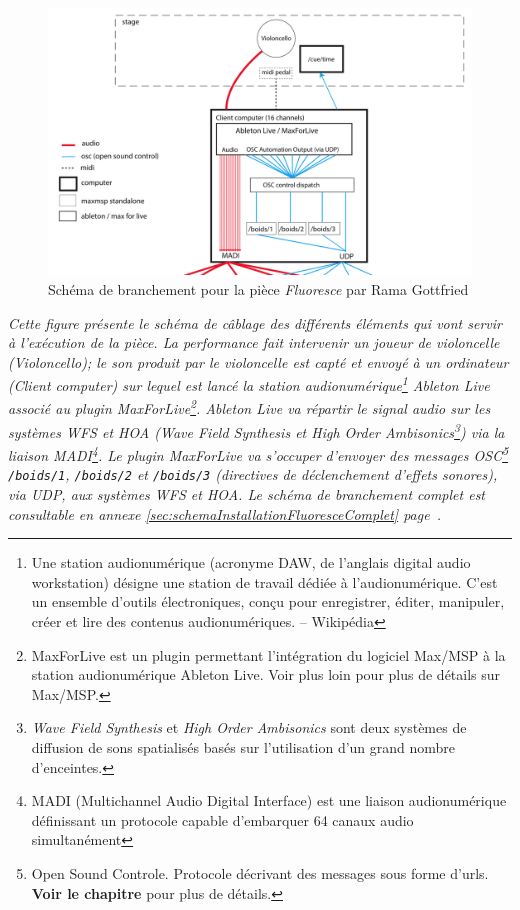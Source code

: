 \begin{figure}[H]
	\centering
	\includegraphics[keepaspectratio=true, width=\textwidth]{Notation/i/schemaInstallationFluoresce.png}
	\caption[Schéma de branchement pour la pièce \textit{Fluoresce} par Rama Gottfried]{Schéma de branchement pour la pièce \textit{Fluoresce} par Rama Gottfried}
	\label{fig:schemaInstallationFluoresce}			
\end{figure}
\begin{center}
\small \it Cette figure présente le schéma de câblage des différents éléments qui vont servir à l'exécution de la pièce. La performance fait intervenir un joueur de violoncelle (\textit{Violoncello}); le son produit par le violoncelle est capté et envoyé à un ordinateur (\textit{Client computer}) sur lequel est lancé la station audionumérique\footnote{Une station audionumérique (acronyme DAW, de l'anglais digital audio workstation) désigne une station de travail dédiée à l'audionumérique. C'est un ensemble d'outils électroniques, conçu pour enregistrer, éditer, manipuler, créer et lire des contenus audionumériques. -- Wikipédia} \textit{Ableton Live} associé au plugin \textit{MaxForLive}\footnote{MaxForLive est un plugin permettant l'intégration du logiciel Max/MSP à la station audionumérique Ableton Live. Voir plus loin pour plus de détails sur Max/MSP.}. Ableton Live va répartir le signal audio sur les systèmes WFS et HOA (\textit{Wave Field Synthesis} et \textit{High Order Ambisonics}\footnote{\textit{Wave Field Synthesis} et \textit{High Order Ambisonics} sont deux systèmes de diffusion de sons spatialisés basés sur l'utilisation d'un grand nombre d'enceintes.}) via la liaison MADI\footnote{MADI (Multichannel Audio Digital Interface) est une liaison audionumérique définissant un protocole capable d'embarquer 64 canaux audio simultanément}. Le plugin MaxForLive va s'occuper d'envoyer des messages OSC\footnote{Open Sound Controle. Protocole décrivant des messages sous forme d'urls. \textbf{Voir le chapitre} pour plus de détails.} \texttt{/boids/1}, \texttt{/boids/2} et \texttt{/boids/3} (directives de déclenchement d'effets sonores), via UDP, aux systèmes WFS et HOA. Le schéma de branchement complet est consultable en annexe \ref{sec:schemaInstallationFluoresceComplet} page~\pageref{sec:schemaInstallationFluoresceComplet}.
\end{center}

